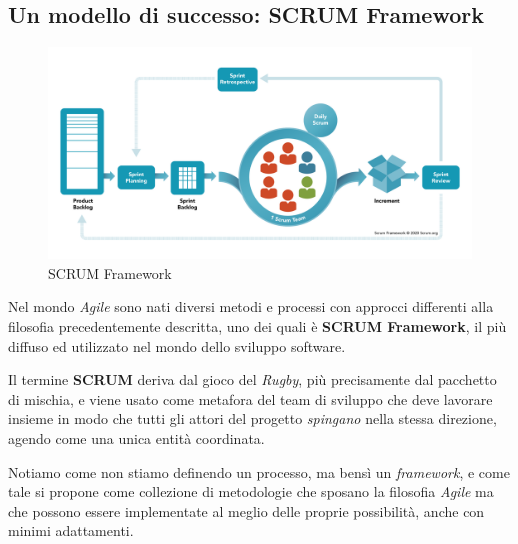 \documentclass[a4paper,12pt]{report}
\begin{document}
			\subsection{Un modello di successo: SCRUM Framework}
			
				\begin{figure}[h]
					\centering
					\includegraphics[width=1\textwidth]{scrum}
					\caption{SCRUM Framework}
					\label{fig:scrum}
				\end{figure}
			
				Nel mondo \emph{Agile} sono nati diversi metodi e processi con approcci differenti alla filosofia precedentemente descritta, uno dei quali è \textbf{SCRUM Framework}, il più diffuso ed utilizzato nel mondo dello sviluppo software.
				
				Il termine \textbf{SCRUM} deriva dal gioco del \emph{Rugby}, più precisamente dal pacchetto di mischia, e viene usato
				come metafora del team di sviluppo che deve lavorare insieme in modo che tutti gli attori del progetto \emph{spingano}
				nella stessa direzione, agendo come una unica entità coordinata.
				
				Notiamo come non stiamo definendo un processo, ma bensì un \emph{framework}, e come tale si propone come
				collezione di metodologie che sposano la filosofia \emph{Agile} ma che possono essere implementate al meglio
				delle proprie possibilità, anche con minimi adattamenti.
				
\end{document}
